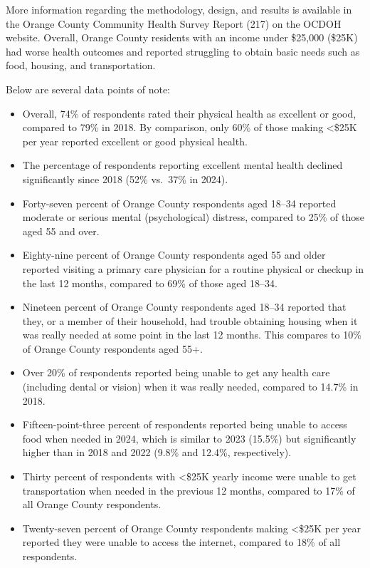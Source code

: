 \documentclass[
  english,
  letterpaper,
]{report}
\providecommand{\tightlist}{%
  \setlength{\itemsep}{0pt}\setlength{\parskip}{0pt}}
\begin{document}
More information regarding the methodology, design, and results is
available in the Orange County Community Health Survey Report (217) on
the OCDOH website. Overall, Orange County residents with an income under
\$25,000 (\$25K) had worse health outcomes and reported struggling to
obtain basic needs such as food, housing, and transportation.

Below are several data points of note:

\begin{itemize}
\tightlist
\item
  Overall, 74\% of respondents rated their physical health as excellent
  or good, compared to 79\% in 2018. By comparison, only 60\% of those
  making \textless\$25K per year reported excellent or good physical
  health.
\item
  The percentage of respondents reporting excellent mental health
  declined significantly since 2018 (52\% vs.~37\% in 2024).
\item
  Forty-seven percent of Orange County respondents aged 18--34 reported
  moderate or serious mental (psychological) distress, compared to 25\%
  of those aged 55 and over.
\item
  Eighty-nine percent of Orange County respondents aged 55 and older
  reported visiting a primary care physician for a routine physical or
  checkup in the last 12 months, compared to 69\% of those aged 18--34.
\item
  Nineteen percent of Orange County respondents aged 18--34 reported
  that they, or a member of their household, had trouble obtaining
  housing when it was really needed at some point in the last 12 months.
  This compares to 10\% of Orange County respondents aged 55+.
\item
  Over 20\% of respondents reported being unable to get any health care
  (including dental or vision) when it was really needed, compared to
  14.7\% in 2018.
\item
  Fifteen-point-three percent of respondents reported being unable to
  access food when needed in 2024, which is similar to 2023 (15.5\%) but
  significantly higher than in 2018 and 2022 (9.8\% and 12.4\%,
  respectively).
\item
  Thirty percent of respondents with \textless\$25K yearly income were
  unable to get transportation when needed in the previous 12 months,
  compared to 17\% of all Orange County respondents.
\item
  Twenty-seven percent of Orange County respondents making
  \textless\$25K per year reported they were unable to access the
  internet, compared to 18\% of all respondents.
\end{itemize}
\end{document}
